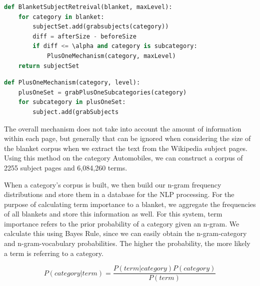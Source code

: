 \begin{lstlisting}[language=Python,frame=single,tabsize=2,caption=BlanketSubjectRetreival, label=BlanketSubjectRetreival]
def BlanketSubjectRetreival(blanket, maxLevel):
	for category in blanket:
		subjectSet.add(grabsubjects(category))
		diff = afterSize - beforeSize
		if diff <= \alpha and category is subcategory:
			PlusOneMechanism(category, maxLevel)
	return subjectSet
\end{lstlisting}

\begin{lstlisting}[language=Python,frame=single,tabsize=2,caption=PlusOneMechanism, label=PlusOneMechanism]
def PlusOneMechanism(category, level):
	plusOneSet = grabPlusOneSubcategories(category)
	for subcategory in plusOneSet:
		subject.add(grabSubjects


\end{lstlisting}

The overall mechanism does not take into account the amount of information within each page, but generally that can be ignored when considering the size of the blanket corpus when we extract the text from the Wikipedia subject pages. Using this method on the category Automobiles, we can construct a corpus of 2255 subject pages and 6,084,260 terms.

When a category's corpus is built, we then build our n-gram frequency distributions and store them in a database for the NLP processing. For the purpose of calculating term importance to a blanket, we aggregate the frequencies of all blankets and store this information as well. For this system, term importance refers to the prior probability of a category given an n-gram. We calculate this using Bayes Rule, since we can easily obtain the n-gram-category and n-gram-vocabulary probabilities. The higher the probability, the more likely a term is referring to a category.

\begin{equation}
P (category | term) = \frac{P(term | category) P(category)}{P(term)}
\end{equation}
